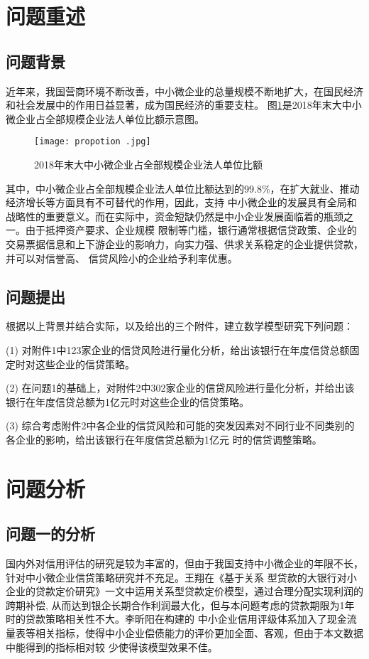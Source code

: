 \documentclass[withoutpreface,bwprint]{cumcmthesis}
\begin{document}
\section{问题重述}
\subsection{问题背景}
近年来，我国营商环境不断改善，中小微企业的总量规模不断地扩大，在国民经济和社会发展中的作用日益显著，成为国民经济的重要支柱。
图\ref{fig:propotion}是2018年末大中小微企业占全部规模企业法人单位比额示意图。

\begin{figure}[H]
    \centering
    \texttt{[image: propotion .jpg]}
    \caption{2018年末大中小微企业占全部规模企业法人单位比额}
    \label{fig:propotion}
\end{figure}

其中，中小微企业占全部规模企业法人单位比额达到的99.8\%，在扩大就业、推动经济增长等方面具有不可替代的作用，因此，支持
中小微企业的发展具有全局和战略性的重要意义。而在实际中，资金短缺仍然是中小企业发展面临着的瓶颈之一。由于抵押资产要求、企业规模
限制等门槛，银行通常根据信贷政策、企业的交易票据信息和上下游企业的影响力，向实力强、供求关系稳定的企业提供贷款，并可以对信誉高、
信贷风险小的企业给予利率优惠。

\subsection{问题提出}
根据以上背景并结合实际，以及给出的三个附件，建立数学模型研究下列问题：

(1) 对附件1中123家企业的信贷风险进行量化分析，给出该银行在年度信贷总额固定时对这些企业的信贷策略。

(2) 在问题1的基础上，对附件2中302家企业的信贷风险进行量化分析，并给出该银行在年度信贷总额为1亿元时对这些企业的信贷策略。

(3) 综合考虑附件2中各企业的信贷风险和可能的突发因素对不同行业不同类别的各企业的影响，给出该银行在年度信贷总额为1亿元
    时的信贷调整策略。

\section{问题分析}
\subsection{问题一的分析}
国内外对信用评估的研究是较为丰富的，但由于我国支持中小微企业的年限不长，针对中小微企业信贷策略研究并不充足。王翔在《基于关系
型贷款的大银行对小企业的贷款定价研究》\cite{wangxiang2008}一文中运用关系型贷款定价模型，通过合理分配实现利润的跨期补偿,
从而达到银企长期合作利润最大化，但与本问题考虑的贷款期限为1年时的贷款策略相关性不大。李昕阳\cite{lixinyang2012}在构建的
中小企业信用评级体系加入了现金流量表等相关指标，使得中小企业偿债能力的评价更加全面、客观，但由于本文数据中能得到的指标相对较
少使得该模型效果不佳。
\end{document}
